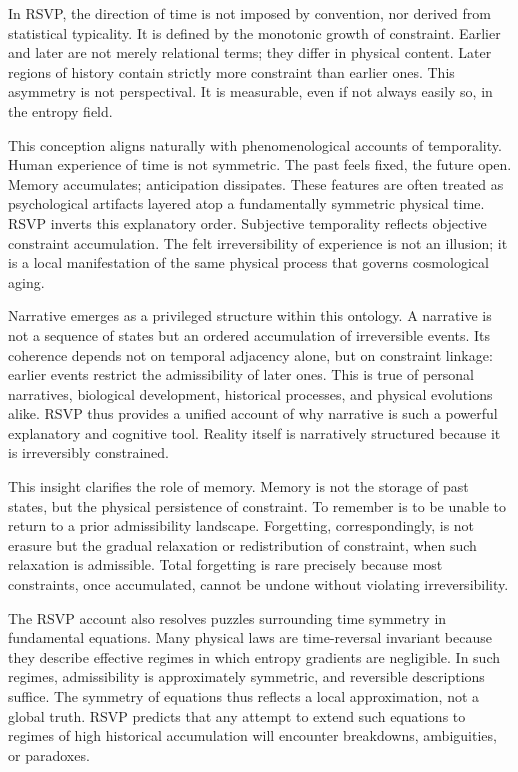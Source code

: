 \documentclass[11pt,oneside]{book}
\begin{document}
In RSVP, the direction of time is not imposed by convention, nor derived from statistical typicality. It is defined by the monotonic growth of constraint. Earlier and later are not merely relational terms; they differ in physical content. Later regions of history contain strictly more constraint than earlier ones. This asymmetry is not perspectival. It is measurable, even if not always easily so, in the entropy field.

This conception aligns naturally with phenomenological accounts of temporality. Human experience of time is not symmetric. The past feels fixed, the future open. Memory accumulates; anticipation dissipates. These features are often treated as psychological artifacts layered atop a fundamentally symmetric physical time. RSVP inverts this explanatory order. Subjective temporality reflects objective constraint accumulation. The felt irreversibility of experience is not an illusion; it is a local manifestation of the same physical process that governs cosmological aging.

Narrative emerges as a privileged structure within this ontology. A narrative is not a sequence of states but an ordered accumulation of irreversible events. Its coherence depends not on temporal adjacency alone, but on constraint linkage: earlier events restrict the admissibility of later ones. This is true of personal narratives, biological development, historical processes, and physical evolutions alike. RSVP thus provides a unified account of why narrative is such a powerful explanatory and cognitive tool. Reality itself is narratively structured because it is irreversibly constrained.

This insight clarifies the role of memory. Memory is not the storage of past states, but the physical persistence of constraint. To remember is to be unable to return to a prior admissibility landscape. Forgetting, correspondingly, is not erasure but the gradual relaxation or redistribution of constraint, when such relaxation is admissible. Total forgetting is rare precisely because most constraints, once accumulated, cannot be undone without violating irreversibility.

The RSVP account also resolves puzzles surrounding time symmetry in fundamental equations. Many physical laws are time-reversal invariant because they describe effective regimes in which entropy gradients are negligible. In such regimes, admissibility is approximately symmetric, and reversible descriptions suffice. The symmetry of equations thus reflects a local approximation, not a global truth. RSVP predicts that any attempt to extend such equations to regimes of high historical accumulation will encounter breakdowns, ambiguities, or paradoxes.
\end{document}
